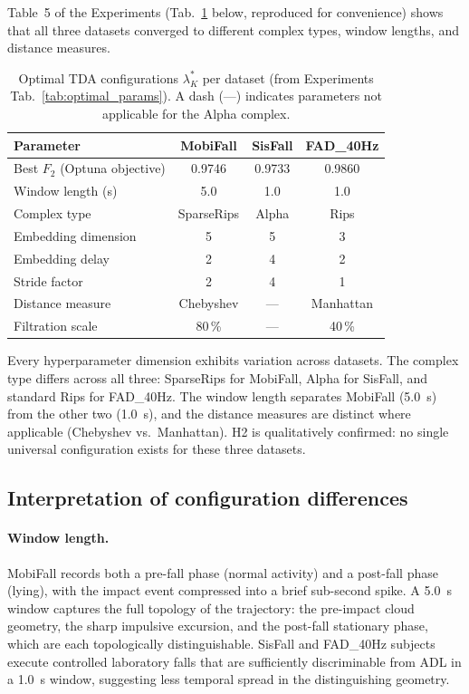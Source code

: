 Table~5 of the Experiments (Tab.~\ref{tab:optimal_params_ref} below, reproduced for
convenience) shows that all three datasets converged to different complex types,
window lengths, and distance measures.

\begin{table}[h!]
\centering
\caption{Optimal TDA configurations $\lambda^*_K$ per dataset (from Experiments
  Tab.~\ref{tab:optimal_params}).  A dash (---) indicates parameters not applicable for
  the Alpha complex.}
\label{tab:optimal_params_ref}
\small
\begin{tabular}{lccc}
\toprule
\textbf{Parameter} & \textbf{MobiFall} & \textbf{SisFall} & \textbf{FAD\_40Hz} \\
\midrule
Best $F_2$ (Optuna objective)  & 0.9746     & 0.9733   & 0.9860      \\
Window length (s)              & 5.0        & 1.0      & 1.0         \\
Complex type                   & SparseRips & Alpha    & Rips        \\
Embedding dimension            & 5          & 5        & 3           \\
Embedding delay                & 2          & 4        & 2           \\
Stride factor                  & 2          & 4        & 1           \\
Distance measure               & Chebyshev  & ---      & Manhattan   \\
Filtration scale               & 80\,\%     & ---      & 40\,\%      \\
\bottomrule
\end{tabular}
\end{table}

Every hyperparameter dimension exhibits variation across datasets.  The complex type
differs across all three: SparseRips for MobiFall, Alpha for SisFall, and standard
Rips for FAD\_40Hz.  The window length separates MobiFall (5.0~s) from the other two
(1.0~s), and the distance measures are distinct where applicable (Chebyshev vs.\
Manhattan).  H2 is qualitatively confirmed: no single universal configuration exists
for these three datasets.

\subsection{Interpretation of configuration differences}

\paragraph{Window length.}
MobiFall records both a pre-fall phase (normal activity) and a post-fall phase (lying),
with the impact event compressed into a brief sub-second spike.  A 5.0~s window captures
the full topology of the trajectory: the pre-impact cloud geometry, the sharp impulsive
excursion, and the post-fall stationary phase, which are each topologically distinguishable.
SisFall and FAD\_40Hz subjects execute controlled laboratory falls that are sufficiently
discriminable from ADL in a 1.0~s window, suggesting less temporal spread in the
distinguishing geometry.

